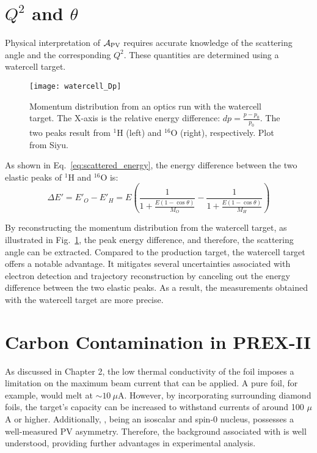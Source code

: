 \section{$Q^2$ and $\theta$}
Physical interpretation of $\mathcal{A}_{\text{PV}}$ requires accurate knowledge
of the scattering angle and the corresponding $Q^2$. These quantities are 
determined using a watercell target. 
\begin{figure}[!h]
    \centering
    \texttt{[image: watercell\_Dp]}
    \caption[Momentum distribution of an watercell run]
    {Momentum distribution from an optics run with the watercell target. 
    The X-axis is the relative energy difference: $dp = \frac{p - p_0}{p_0}$. 
    The two peaks result from ${}^1$H (left) and ${}^{16}$O (right), respectively. 
    Plot from Siyu.}
    \label{fig:watercell}
\end{figure}
As shown in Eq.~\ref{eq:scattered_energy}, the energy difference between the
two elastic peaks of ${}^1$H and ${}^{16}$O is:
\begin{equation}
    \Delta E' = E'_O - E'_H = E\left( \frac{1}{1 + \frac{E(1-\cos\theta)}{M_O}} -
    \frac{1}{1 + \frac{E(1-\cos\theta)}{M_H}} \right)
\end{equation}

By reconstructing the momentum distribution from the watercell target, as illustrated
in Fig.~\ref{fig:watercell}, the peak energy difference, and therefore, the 
scattering angle can be extracted.
Compared to the production target, the watercell target offers a notable advantage. It mitigates several uncertainties associated with electron detection and trajectory reconstruction by canceling out the energy difference between the two elastic peaks. As a result, the measurements obtained with the watercell target are more precise.

\section{Carbon Contamination in PREX-II}
As discussed in Chapter 2, the low thermal conductivity of the \Pb foil imposes a limitation
on the maximum beam current that can be applied. A pure \Pb foil, for example, would melt at 
$\sim 10 \ \mu$A. However, by incorporating surrounding diamond foils, the \Pb target's capacity can be increased to withstand currents of around 100 $\mu$A or higher.
Additionally, \Carbon, being an isoscalar and spin-0 nucleus, possesses a well-measured PV asymmetry. Therefore, the background associated with \Carbon is well understood, providing further advantages in experimental analysis. %

